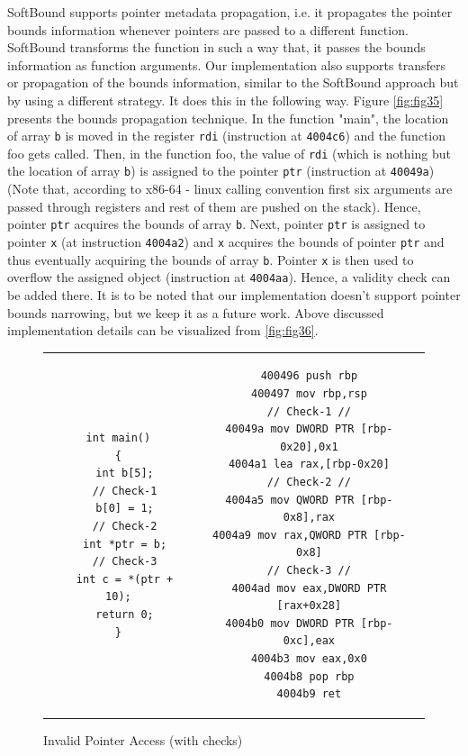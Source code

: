 SoftBound supports pointer metadata propagation, i.e. it propagates the pointer bounds information whenever pointers are passed to a different function. SoftBound transforms the function in such a way that, it passes the bounds information as function arguments. Our implementation also supports transfers or propagation of the bounds information, similar to the SoftBound approach but by using a different strategy. It does this in the following way. Figure \cref{fig:fig35} presents the bounds propagation technique. In the function "main", the location of array \texttt{b} is moved in the register \texttt{rdi} (instruction at \texttt{4004c6}) and the function foo gets called. Then, in the function foo, the value of \texttt{rdi} (which is nothing but the location of array \texttt{b}) is assigned to the pointer \texttt{ptr} (instruction at \texttt{40049a}) (Note that, according to x86-64 - linux calling convention first six arguments are passed through registers and rest of them are pushed on the stack). Hence, pointer \texttt{ptr} acquires the bounds of array \texttt{b}. Next, pointer \texttt{ptr} is assigned to pointer \texttt{x} (at instruction \texttt{4004a2}) and \texttt{x} acquires the bounds of pointer \texttt{ptr} and thus eventually acquiring the bounds of array \texttt{b}. Pointer \texttt{x} is then used to overflow the assigned object (instruction at \texttt{4004aa}). Hence, a validity check can be added there. It is to be noted that our implementation doesn't support pointer bounds narrowing, but we keep it as a future work. Above discussed implementation details can be visualized from \cref{fig:fig36}.
\begin{figure}
\begin{centering}
\begin{tabular}{ c | c }
\begin{lstlisting}
int main()
{
  int b[5];
  // Check-1
  b[0] = 1;
  // Check-2
  int *ptr = b;
  // Check-3
  int c = *(ptr + 10);
  return 0;
}
\end{lstlisting}
&
\begin{lstlisting}
400496 push rbp
400497 mov rbp,rsp
// Check-1 //
40049a mov DWORD PTR [rbp-0x20],0x1
4004a1 lea rax,[rbp-0x20]
// Check-2 //
4004a5 mov QWORD PTR [rbp-0x8],rax
4004a9 mov rax,QWORD PTR [rbp-0x8]
// Check-3 //
4004ad mov eax,DWORD PTR [rax+0x28]
4004b0 mov DWORD PTR [rbp-0xc],eax
4004b3 mov eax,0x0
4004b8 pop rbp
4004b9 ret
\end{lstlisting}
\end{tabular}
\caption{Invalid Pointer Access (with checks)\label{fig:fig34}}
\par\end{centering}
\end{figure}

